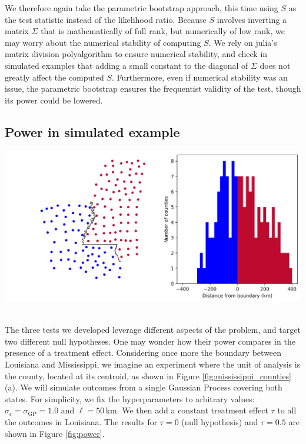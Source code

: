 \documentclass[letter]{article}
\makeatletter
\def\maxwidth{\ifdim\Gin@nat@width>\linewidth\linewidth
    \else\Gin@nat@width\fi}
\let\Oldincludegraphics\includegraphics
\renewcommand{\includegraphics}[1]{\Oldincludegraphics[width=.8\maxwidth]{#1}}
\newcommand{\sigmaf}{\sigma_{\mathrm{GP}}}
\newcommand{\sigman}{\sigma_{\epsilon}}
\makeatother
\begin{document}
We therefore again take the parametric bootstrap approach, this time
using \(S\) as the test statistic instead of the likelihood ratio.
Because \(S\) involves inverting a matrix \(\Sigma\) that is
mathematically of full rank, but numerically of low rank, we may worry
about the numerical stability of computing \(S\). We rely on julia's
matrix division polyalgorithm to ensure numerical stability, and check
in simulated examples that adding a small constant to the diagonal of
\(\Sigma\) does not greatly affect the computed \(S\). Furthermore, even
if numerical stability was an issue, the parametric bootstrap ensures
the frequentist validity of the test, though its power could be lowered.
    


    	\subsection{Power in simulated
example}\label{power-in-simulated-example}

\includegraphics{figures/mississippi_counties.png}
\(\label{fig:mississippi_counties}\)

The three tests we developed leverage different aspects of the problem,
and target two different null hypotheses. One may wonder how their power
compares in the presence of a treatment effect. Considering once more
the boundary between Louisiana and Mississippi, we imagine an experiment
where the unit of analysis is the county, located at its centroid, as
shown in Figure \ref{fig:mississippi_counties}(a). We will simulate
outcomes from a single Gaussian Process covering both states. For
simplicity, we fix the hyperparameters to arbitrary values:
\(\sigman=\sigmaf=1.0\) and \(\ell=50\,\mathrm{km}\). We then add a
constant treatment effect \(\tau\) to all the outcomes in Louisiana. The
results for \(\tau=0\) (null hypothesis) and \(\tau=0.5\) are shown in
Figure \ref{fig:power}.
\end{document}
